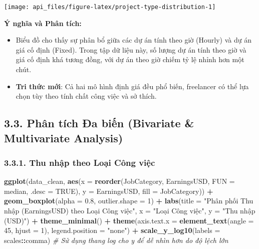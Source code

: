 \documentclass[
]{article}
\newenvironment{Shaded}{\begin{snugshade}}{\end{snugshade}}
\newcommand{\AttributeTok}[1]{\textcolor[rgb]{0.13,0.29,0.53}{#1}}
\newcommand{\CommentTok}[1]{\textcolor[rgb]{0.56,0.35,0.01}{\textit{#1}}}
\newcommand{\ConstantTok}[1]{\textcolor[rgb]{0.56,0.35,0.01}{#1}}
\newcommand{\DecValTok}[1]{\textcolor[rgb]{0.00,0.00,0.81}{#1}}
\newcommand{\FloatTok}[1]{\textcolor[rgb]{0.00,0.00,0.81}{#1}}
\newcommand{\FunctionTok}[1]{\textcolor[rgb]{0.13,0.29,0.53}{\textbf{#1}}}
\newcommand{\NormalTok}[1]{#1}
\newcommand{\SpecialCharTok}[1]{\textcolor[rgb]{0.81,0.36,0.00}{\textbf{#1}}}
\newcommand{\StringTok}[1]{\textcolor[rgb]{0.31,0.60,0.02}{#1}}
\begin{document}
\begin{center}\texttt{[image: api\_files/figure-latex/project-type-distribution-1]} \end{center}

\textbf{Ý nghĩa và Phân tích:}

\begin{itemize}
\item
  Biểu đồ cho thấy sự phân bổ giữa các dự án tính theo giờ (Hourly) và
  dự án giá cố định (Fixed). Trong tập dữ liệu này, số lượng dự án tính
  theo giờ và giá cố định khá tương đồng, với dự án theo giờ chiếm tỷ lệ
  nhỉnh hơn một chút.
\item
  \textbf{Tri thức mới}: Cả hai mô hình định giá đều phổ biến,
  freelancer có thể lựa chọn tùy theo tính chất công việc và sở thích.
\end{itemize}

\subsection{3.3. Phân tích Đa biến (Bivariate \& Multivariate
Analysis)}\label{phuxe2n-tuxedch-ux111a-biux1ebfn-bivariate-multivariate-analysis}

\subsubsection{3.3.1. Thu nhập theo Loại Công
việc}\label{thu-nhux1eadp-theo-loux1ea1i-cuxf4ng-viux1ec7c}

\begin{Shaded}
\begin{Highlighting}[]
\FunctionTok{ggplot}\NormalTok{(data\_clean, }\FunctionTok{aes}\NormalTok{(}\AttributeTok{x =} \FunctionTok{reorder}\NormalTok{(JobCategory, EarningsUSD, }\AttributeTok{FUN =}\NormalTok{ median, }\AttributeTok{.desc =} \ConstantTok{TRUE}\NormalTok{), }\AttributeTok{y =}\NormalTok{ EarningsUSD, }\AttributeTok{fill =}\NormalTok{ JobCategory)) }\SpecialCharTok{+}
  \FunctionTok{geom\_boxplot}\NormalTok{(}\AttributeTok{alpha =} \FloatTok{0.8}\NormalTok{, }\AttributeTok{outlier.shape =} \DecValTok{1}\NormalTok{) }\SpecialCharTok{+}
  \FunctionTok{labs}\NormalTok{(}\AttributeTok{title =} \StringTok{"Phân phối Thu nhập (EarningsUSD) theo Loại Công việc"}\NormalTok{,}
       \AttributeTok{x =} \StringTok{"Loại Công việc"}\NormalTok{,}
       \AttributeTok{y =} \StringTok{"Thu nhập (USD)"}\NormalTok{) }\SpecialCharTok{+}
  \FunctionTok{theme\_minimal}\NormalTok{() }\SpecialCharTok{+}
  \FunctionTok{theme}\NormalTok{(}\AttributeTok{axis.text.x =} \FunctionTok{element\_text}\NormalTok{(}\AttributeTok{angle =} \DecValTok{45}\NormalTok{, }\AttributeTok{hjust =} \DecValTok{1}\NormalTok{), }\AttributeTok{legend.position =} \StringTok{"none"}\NormalTok{) }\SpecialCharTok{+}
  \FunctionTok{scale\_y\_log10}\NormalTok{(}\AttributeTok{labels =}\NormalTok{ scales}\SpecialCharTok{::}\NormalTok{comma) }\CommentTok{\# Sử dụng thang log cho y để dễ nhìn hơn do độ lệch lớn}
\end{Highlighting}
\end{Shaded}
\end{document}

